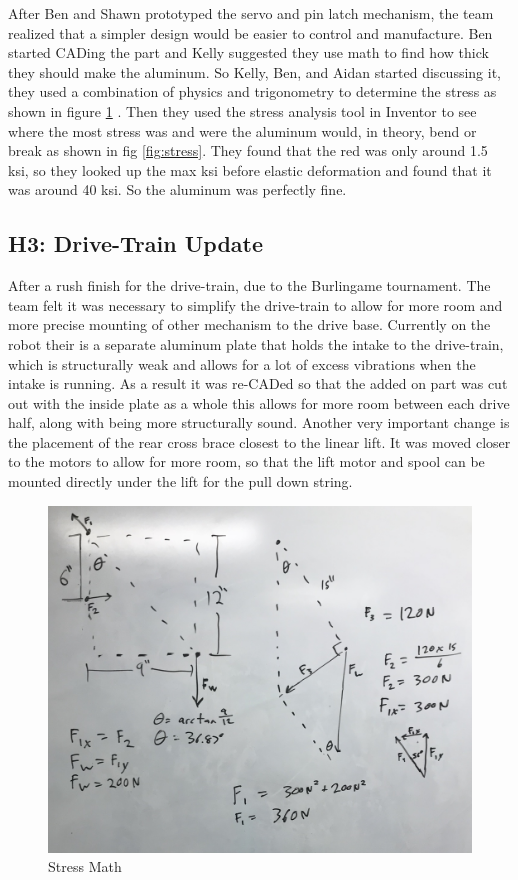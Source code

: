 \documentclass{article}
\begin{document}
After Ben and Shawn prototyped the servo and pin latch mechanism, the team realized that a simpler design would be easier to control and manufacture. Ben started CADing the part and Kelly suggested they use math to find how thick they should make the aluminum. So Kelly, Ben, and Aidan started discussing it, they used a combination of physics and trigonometry to determine the stress as shown in figure \ref{fig:math} . Then they used the stress analysis tool in Inventor to see where the most stress was and were the aluminum would, in theory, bend or break as shown in fig \ref{fig:stress}. They found that the red was only around 1.5 ksi, so they looked up the max ksi before elastic deformation and found that it was around 40 ksi. So the aluminum was perfectly fine.


\subsection{H3: Drive-Train Update}

After a rush finish for the drive-train, due to the Burlingame tournament. The team felt it was necessary to simplify the drive-train to allow for more room and more precise mounting of other mechanism to the drive base. Currently on the robot their is a separate aluminum plate that holds the intake to the drive-train, which is structurally  weak and allows for a lot of excess vibrations when the intake is running. As a result it was re-CADed so that the added on part was cut out with the inside plate as a whole this allows for more room between each drive half, along with being more structurally sound. Another very important change is the placement of the rear cross brace closest to the linear lift. It was moved closer to the motors to allow for more room, so that the lift motor and spool can be mounted directly under the lift for the pull down string. 

\begin{figure}
    \centering
    \includegraphics[width=.6 \textwidth]{14_12-03/images/Math.jpg}
    \caption{Stress Math}
    \label{fig:math}
\end{figure}
\end{document}

